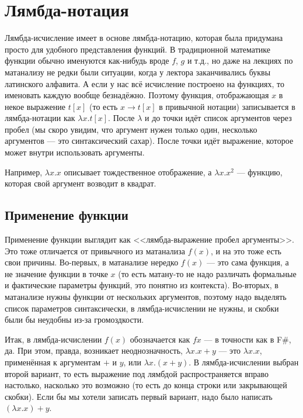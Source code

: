 \documentclass{../../text-style}
\begin{document}
\section{Лямбда-нотация}

Лямбда-исчисление имеет в основе лямбда-нотацию, которая была придумана просто для удобного представления функций. В традиционной математике функции обычно именуются как-нибудь вроде $f$, $g$ и т.д., но даже на лекциях по матанализу не редки были ситуации, когда у лектора заканчивались буквы латинского алфавита. А если у нас всё исчисление построено на функциях, то именовать каждую вообще безнадёжно. Поэтому функция, отображающая $x$ в некое выражение $t[x]$ (то есть $x \rightarrow t[x]$ в привычной нотации) записывается в лямбда-нотации как $\lambda x.t[x]$. После $\lambda$ и до точки идёт список аргументов через пробел (мы скоро увидим, что аргумент нужен только один, несколько аргументов --- это синтаксический сахар). После точки идёт выражение, которое может внутри использовать аргументы.

Например, $\lambda x.x$ описывает тождественное отображение, а $\lambda x.x^2$ --- функцию, которая свой аргумент возводит в квадрат.

\subsection{Применение функции}

Применение функции выглядит как <<лямбда-выражение пробел аргументы>>. Это тоже отличается от привычного из матанализа $f(x)$, и на это тоже есть свои причины. Во-первых, в матанализе нередко $f(x)$ --- это сама функция, а не значение функции в точке $x$ (то есть матану-то не надо различать формальные и фактические параметры функций, это понятно из контекста). Во-вторых, в матанализе нужны функции от нескольких аргументов, поэтому надо выделять список параметров синтаксически, в лямбда-исчислении не нужны, и скобки были бы неудобны из-за громоздкости.

Итак, в лямбда-исчислении $f(x)$ обозначается как $f x$ --- в точности как в F\#, да. При этом, правда, возникает неоднозначность, $\lambda x. x + y$ --- это $\lambda x.x$, применённая к аргументам $+$ и $y$, или $\lambda x.(x + y)$. В лямбда-исчислении выбран второй вариант, то есть выражение под лямбдой распространяется вправо настолько, насколько это возможно (то есть до конца строки или закрывающей скобки). Если бы мы хотели записать первый вариант, надо было написать $(\lambda x.x) + y$.
\end{document}
